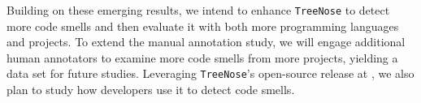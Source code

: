 
Building on these emerging results, we intend to enhance \texttt{TreeNose} to
detect more code smells and then evaluate it with both more programming
languages and projects. To extend the manual annotation study, we will engage
additional human annotators to examine more code smells from more projects,
yielding a data set for future studies.
%
Leveraging \texttt{TreeNose}'s open-source release at \texttt{\GitHubLink{}},
we also plan to study how developers use it to detect code smells.
